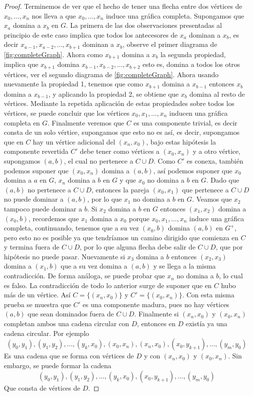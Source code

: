 \begin{proof}
Terminemos de ver que el hecho de tener una flecha entre dos v\'ertices de
$x_0,\dots,x_n$ nos lleva a que $x_0,\dots,x_n$ induce una gr\'afica completa.
Supongamos que $x_a$ domina a $x_b$ en $G$. La primera de las dos observaciones
presentadas al principio de este caso implica que todos los antecesores de
$x_a$ dominan a $x_b$, es decir $x_{a-1}, x_{a-2},\dots, x_{b+1}$ dominan a
$x_b$, observe el primer diagrama de  \cref{fig:completeGraph}. Ahora como
$x_{b+1}$ domina a $x_b$ la segunda propiedad, implica que
$x_{b+1}$ domina $x_{b-1}, x_{b-2},\dots,x_{b+2}$ esto es, domina a todos los
otros v\'ertices, ver el segundo diagrama de \cref{fig:completeGraph}. Ahora usando
nuevamente la propiedad 1, tenemos que como $x_{b+1}$ domina a $x_{b-1}$
entonces $x_b$ domina a $x_{b-1}$, y aplicando la propiedad 2, se obtiene que
$x_b$ domina al resto de v\'ertices. Mediante la repetida aplicaci\'on de estas
propiedades sobre todos los v\'ertices, se puede concluir que los v\'ertices
$x_0,x_1,\dots,x_n$ inducen una gr\'afica completa en $G$. Finalmente veremos
que $C$ es una componente trivial, es decir consta de un solo v\'ertice,
supongamos que esto no es así, es decir, supongamos que en $C$ hay un v\'ertice
adicional del $(x_n,x_0)$, bajo estas hip\'otesis la componente revertida
$C'$ debe tener como v\'ertices a $(x_0,x_n)$ y a otro v\'ertice, supongamos
$(a,b)$, el cual no pertenece a $C\cup D$. Como $C'$ es conexa, tambi\'en podemos
suponer que
$(x_0,x_n)$ domina a $(a,b)$, así podemos suponer que $x_0$ domina a $a$ en $G$,
$x_n$ domina a $b$ en $G$ y que $x_0$ no domina a  $b$ en $G$. Dado que $(a,b)$
no pertenece a $C\cup D$, entonces la pareja $(x_0,x_1)$ que pertenece a $C\cup
D$ no puede dominar a $(a,b)$, por lo que $x_1$ no domina a $b$ en $G$. Veamos
que $x_2$ tampoco puede dominar a $b$.  Si $x_2$  domina a $b$ en $G$ entonces
$(x_1,x_2)$ domina a $(x_0,b)$, recordemos que $x_1$ domina a $x_0$ porque
$x_0,x_1,\dots,x_n$ induce una gr\'afica completa, continuando, tenemos que a su
vez $(x_0,b)$ domina $(a,b)$ en $G^+$, pero esto no es posible ya que tendríamos
un camino dirigido que comienza en $C$ y termina fuera de $C\cup D$, por lo que
alguna flecha debe salir de $C\cup D$, que por hip\'otesis no puede pasar.
Nuevamente si $x_3$ domina a $b$ entonces $(x_2,x_3)$ domina a $(x_1,b)$ que a
su vez domina a $(a,b)$ y se llega a la misma contradicci\'on. De forma
an\'aloga, se puede probar que $x_n$ no domina a $b$, lo cual es falso. La
contradicci\'on de todo lo anterior surge de suponer que en $C$ hubo m\'as de un
v\'ertice. Así $C=\{ (x_n,x_0)\} $ y $C'=\{ (x_0,x_n)\}$. Con esta misma prueba
se muestra que $C'$ es una componente madura, pues no hay v\'ertices $(a,b)$ que
sean dominados fuera de $C\cup D$. Finalmente si $(x_n,x_0)$ y $(x_0,x_n)$
completan ambos una cadena circular con $D$, entonces en $D$ existía ya una
cadena circular. Por ejemplo 
$$  (y_0,y_1),(y_1,y_2),\dots, (y_k,x_0), (x_0,x_n), (x_n,x_0), (x_0,
y_{k+1}),\dots, (y_m,y_0) $$ Es una cadena que se forma con v\'ertices de $D$ y
con $(x_n,x_0)$ y $(x_0,x_n)$. Sin embargo, se puede formar la cadena 
$$  (y_0,y_1),(y_1,y_2),\dots, (y_k,x_0), (x_0, y_{k+1}),\dots, (y_m,y_0) $$ Que
consta de v\'ertices de $D$. 


\end{proof}
